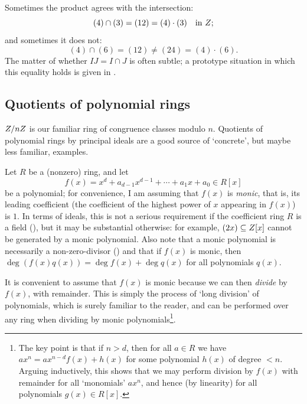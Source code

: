  Sometimes the product agrees with the intersection:
\[
  (4) \cap (3) = (12) = (4) \cdot (3) \quad \text{in } Z;
\]
and sometimes it does not:
\[
  (4) \cap (6) = (12) \neq (24) = (4) \cdot (6).
\]
The matter of whether $IJ = I \cap J$ is often subtle; a prototype
situation in which this equality holds is given in
.

\subsection{Quotients of polynomial rings}
\label{subsec:rings:quotients-of-polynomial-rings}

$Z/nZ$ is our familiar ring of congruence classes modulo
$n$. Quotients of polynomial rings by principal ideals are a good
source of `concrete', but maybe less familiar, examples.

Let $R$ be a (nonzero) ring, and let
\[
  f(x) = x^d + a_{d-1}x^{d-1} + \cdots + a_1 x + a_0 \in R[x]
\]
be a polynomial; for convenience, I am assuming that $f(x)$ is
\emph{monic}, that is, its leading coefficient (the coefficient of the
highest power of $x$ appearing in $f(x)$) is $1$. In terms of ideals,
this is not a serious requirement if the coefficient ring $R$ is a
field (), but it may
be substantial otherwise: for example, $(2x) \subseteq Z[x]$ cannot
be generated by a monic polynomial. Also note that a monic polynomial
is necessarily a non-zero-divisor
() and that if $f(x)$ is
monic, then $\deg(f(x)q(x)) = \deg f(x) + \deg q(x)$ for all
polynomials $q(x)$.

It is convenient to assume that $f(x)$ is monic because we can then
\emph{divide} by $f(x)$, with remainder.  This is simply
the process of `long division' of polynomials, which is surely
familiar to the reader, and can be performed over any ring when
dividing by monic polynomials\footnote{The key point is that if
  $n > d$, then for all $a \in R$ we have $ax^n = ax^{n-d}f(x) + h(x)$
  for some polynomial $h(x)$ of degree $< n$. Arguing inductively,
  this shows that we may perform division by $f(x)$ with remainder for
  all `monomials' $ax^n$, and hence (by linearity) for all polynomials
  $g(x) \in R[x]$.}.

